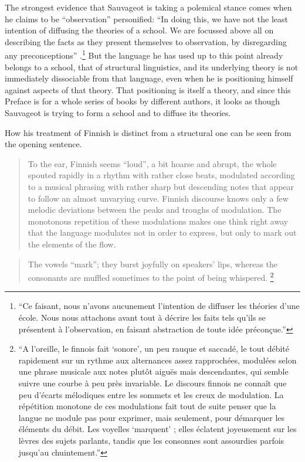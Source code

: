 \documentclass[output=paper]{langscibook}
\begin{document}
The strongest evidence that Sauvageot is taking a polemical stance comes when he claims to be ``observation'' personified: ``In doing this, we have not the least intention of diffusing the theories of a school. We are focussed above all on describing the facts as they present themselves to observation, by disregarding any preconceptions'' \citep[7--8]{Sauvageot1946}.\footnote{``Ce faisant, nous n'avons aucunement l'intention de diffuser les théories d'une école. Nous nous attachons avant tout à décrire les faits tels qu'ils se présentent à l'observation, en faisant abstraction de toute idée préconçue.''} But the language he has used up to this point already belongs to a school, that of structural linguistics, and its underlying theory is not immediately dissociable from that language, even when he is positioning himself against aspects of that theory. That positioning is itself a theory, and since this Preface is for a whole series of books by different authors, it looks as though Sauvageot is trying to form a school and to diffuse its theories.

How his treatment of Finnish is distinct from a structural one can be seen from the opening sentence. 

\begin{quotation}
To the ear, Finnish seems ``loud'', a bit hoarse and abrupt, the whole spouted rapidly in a rhythm with rather close beats, modulated according to a musical phrasing with rather sharp but descending notes that appear to follow an almost unvarying curve. Finnish discourse knows only a few melodic deviations between the peaks and troughs of modulation. The monotonous repetition of these modulations makes one think right away that the language modulates not in order to express, but only to mark out the elements of the flow.
\end{quotation}

\begin{quotation}
The vowels ``mark''; they burst joyfully on speakers' lips, whereas the consonants are muffled sometimes to the point of being whispered. \citep[15]{Sauvageot1946}\footnote{``A l'oreille, le finnois fait `sonore', un peu rauque et saccadé, le tout débité rapidement sur un rythme aux alternances assez rapprochées, modulées selon une phrase musicale aux notes plutôt aiguës mais descendantes, qui semble suivre une courbe à peu près invariable. Le discours finnois ne connaît que peu d'écarts mélodiques entre les sommets et les creux de modulation. La répétition monotone de ces modulations fait tout de suite penser que la langue ne module pas pour exprimer, mais seulement, pour démarquer les éléments du débit. Les voyelles `marquent' ; elles éclatent joyeusement sur les lèvres des sujets parlants, tandis que les consonnes sont assourdies parfois jusqu'au chuintement.''}
\end{quotation}
\end{document}
